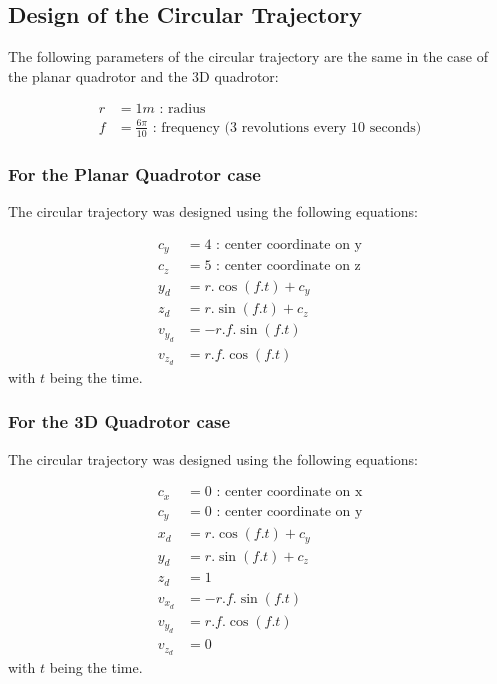 \documentclass{thesisreport}
\begin{document}
\newpage

\subsection{Design of the Circular Trajectory}

The following parameters of the circular trajectory are the same in the case of the planar quadrotor and the 3D quadrotor:

\begin{align*}
	r &= 1m \text{ : radius}  \\
	f &= \frac{6 \pi}{10} \text{ : frequency (3 revolutions every 10 seconds)}
\end{align*}

\subsubsection{For the Planar Quadrotor case}

The circular trajectory was designed using the following equations:

\begin{align*}
	c_y &= 4 \text{ : center coordinate on y}\\
	c_z &= 5 \text{ : center coordinate on z}\\
	y_d &= r.\cos(f.t) + c_y \\
	z_d &= r.\sin(f.t) + c_z \\
	v_{y_d} &= -r.f.\sin(f.t) \\ 
	v_{z_d} &=  r.f.\cos(f.t)
\end{align*}
with $t$ being the time.

\subsubsection{For the 3D Quadrotor case}
The circular trajectory was designed using the following equations:

\begin{align*}
	c_x &= 0 \text{ : center coordinate on x}\\
	c_y &= 0 \text{ : center coordinate on y}\\
	x_d &= r.\cos(f.t) + c_y \\
	y_d &= r.\sin(f.t) + c_z \\
	z_d &= 1 \\
	v_{x_d} &= -r.f.\sin(f.t) \\ 
	v_{y_d} &=  r.f.\cos(f.t) \\
	v_{z_d} &= 0
\end{align*}
with $t$ being the time.
\end{document}
